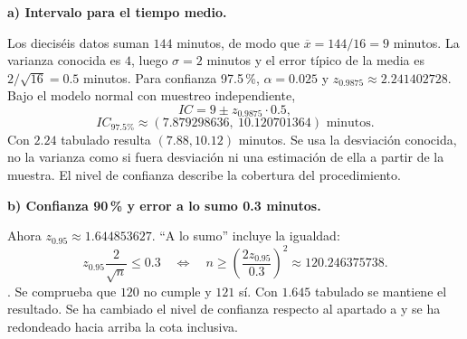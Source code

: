 \textbf{a) Intervalo para el tiempo medio.}\par\nopagebreak[4]
Los dieciséis datos suman $144$ minutos, de modo que $\overline x=144/16=9$ minutos. La varianza conocida es $4$, luego $\sigma=2$ minutos y el error típico de la media es $2/\sqrt{16}=0.5$ minutos.
Para confianza 97.5\,\%, $\alpha=0.025$ y $z_{0.9875}\approx2.241402728$. Bajo el modelo normal con muestreo independiente,
\[
IC=9\pm z_{0.9875}\cdot0.5,
\]
\[
\boxed{IC_{\text{97.5\%}}\approx(7.879298636,\ 10.120701364)\text{ minutos}.}
\]
Con $2.24$ tabulado resulta $(7.88,10.12)$ minutos. Se usa la desviación conocida, no la varianza como si fuera desviación ni una estimación de ella a partir de la muestra. El nivel de confianza describe la cobertura del procedimiento.

\textbf{b) Confianza 90\,\% y error a lo sumo 0.3 minutos.}\par\nopagebreak[4]
Ahora $z_{0.95}\approx1.644853627$. ``A lo sumo'' incluye la igualdad:
\[
z_{0.95}\frac2{\sqrt n}\leq0.3
\quad\Longleftrightarrow\quad
n\geq\left(\frac{2z_{0.95}}{0.3}\right)^2
\approx120.246375738.
\]
. Se comprueba que $120$ no cumple y $121$ sí. Con $1.645$ tabulado se mantiene el resultado. Se ha cambiado el nivel de confianza respecto al apartado a y se ha redondeado hacia arriba la cota inclusiva.
